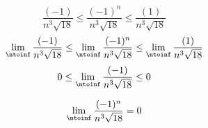 
    $$ \frac{(-1)}{n^3 \sqrt{18}} \le \frac{(-1)^n}{n^3 \sqrt{18}} \le \frac{(1)}{n^3 \sqrt{18}} $$
    $$ \lim_{\ntoinf}\frac{(-1)}{n^3 \sqrt{18}} \le \lim_{\ntoinf}\frac{(-1)^n}{n^3 \sqrt{18}} \le \lim_{\ntoinf}\frac{(1)}{n^3 \sqrt{18}} $$
    $$ 0 \le \lim_{\ntoinf}\frac{(-1)}{n^3 \sqrt{18}} \le 0 $$ 

    $$ \lim_{\ntoinf} \frac{(-1)^n}{n^3\sqrt{18}} = 0 $$

